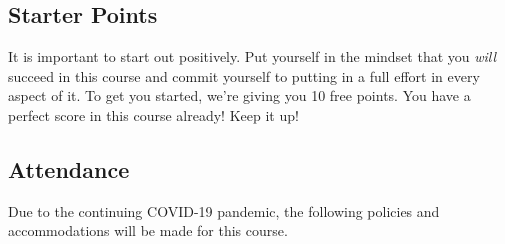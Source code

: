 \documentclass[12pt]{scrartcl}
\begin{document}
\subsection{Starter Points}

It is important to start out positively.  Put yourself in the mindset
that you \emph{will} succeed in this course and commit yourself to
putting in a full effort in every aspect of it.  To get you started,
we're giving you 10 free points.  You have a perfect score in this
course already!  Keep it up!

\subsection{Attendance}

Due to the continuing COVID-19 pandemic, the following policies and
accommodations will be made for this course.
\end{document}
